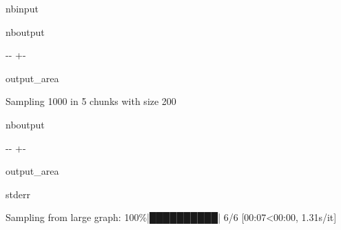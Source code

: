 \documentclass[letterpaper,10pt,english]{sphinxhowto}
\begin{document}
\begin{sphinxuseclass}{nbinput}
{
\begin{sphinxVerbatim}[commandchars=\\\{\}]
\llap{\color{nbsphinxin}[9]:\,\hspace{\fboxrule}\hspace{\fboxsep}}   

    
\end{sphinxVerbatim}
}

\end{sphinxuseclass}
\begin{sphinxuseclass}{nboutput}
{

\kern-\sphinxverbatimsmallskipamount\kern-\baselineskip
\kern+\FrameHeightAdjust\kern-\fboxrule
\vspace{\nbsphinxcodecellspacing}

\begin{sphinxuseclass}{output_area}
\begin{sphinxuseclass}{}


\begin{sphinxVerbatim}[commandchars=\\\{\}]

Sampling 1000 in 5 chunks with size 200
\end{sphinxVerbatim}



\end{sphinxuseclass}
\end{sphinxuseclass}
}

\end{sphinxuseclass}
\begin{sphinxuseclass}{nboutput}
{

\kern-\sphinxverbatimsmallskipamount\kern-\baselineskip
\kern+\FrameHeightAdjust\kern-\fboxrule
\vspace{\nbsphinxcodecellspacing}

\begin{sphinxuseclass}{output_area}
\begin{sphinxuseclass}{stderr}


\begin{sphinxVerbatim}[commandchars=\\\{\}]
Sampling from large graph: 100\%|██████████| 6/6 [00:07<00:00,  1.31s/it]
\end{sphinxVerbatim}



\end{sphinxuseclass}
\end{sphinxuseclass}
}

\end{sphinxuseclass}
\end{document}
